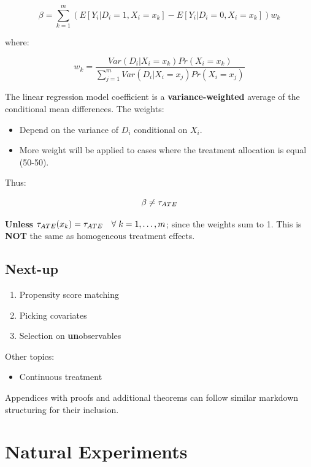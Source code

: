 \documentclass[
  letterpaper,
  DIV=11,
  numbers=noendperiod]{scrreprt}
\providecommand{\tightlist}{%
  \setlength{\itemsep}{0pt}\setlength{\parskip}{0pt}}\usepackage{longtable,booktabs,array}
\theoremstyle{definition}
\theoremstyle{remark}
\begin{document}
\[
\beta = \sum_{k=1}^{m} \left( E[Y_i | D_i = 1, X_i = x_k] - E[Y_i | D_i = 0, X_i = x_k] \right) w_k
\]

where:

\[
w_k = \frac{Var(D_i | X_i = x_k) Pr(X_i = x_k)}{\sum_{j=1}^{m} Var(D_i | X_i = x_j) Pr(X_i = x_j)}
\]

The linear regression model coefficient is a \textbf{variance-weighted}
average of the conditional mean differences. The weights:

\begin{itemize}
\tightlist
\item
  Depend on the variance of \(D_i\) conditional on \(X_i\).
\item
  More weight will be applied to cases where the treatment allocation is
  equal (50-50).
\end{itemize}

Thus:

\[
\beta \neq \tau_{\scriptsize{ATE}}
\]

\textbf{Unless}
\(\tau_{\scriptsize{ATE}}(x_k) = \tau_{\scriptsize{ATE}} \quad \forall \; k = 1, \ldots, m\);
since the weights sum to 1. This is \textbf{NOT} the same as homogeneous
treatment effects.

\chapter{Next-up}\label{next-up-1}

\begin{enumerate}
\def\labelenumi{\arabic{enumi}.}
\tightlist
\item
  Propensity score matching
\item
  Picking covariates
\item
  Selection on \textbf{un}observables
\end{enumerate}

Other topics:

\begin{itemize}
\tightlist
\item
  Continuous treatment
\end{itemize}

Appendices with proofs and additional theorems can follow similar
markdown structuring for their inclusion.

\part{Natural Experiments}
\end{document}

